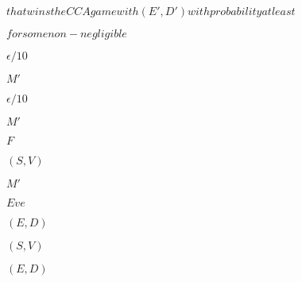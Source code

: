 \documentclass[10pt]{book}
\begin{document}
\begin{mdSnippets}
\begin{mdInlineSnippet}[8e20f2ad2f9a2e0359fc554aa92ce8ee]
$ that wins the CCA game with (E',D') with probability at least $\end{mdInlineSnippet}%
\begin{mdInlineSnippet}[70dfa4b4b54c7864c2bc42c5a41ca800]%
$for some non-negligible $\end{mdInlineSnippet}%
\begin{mdInlineSnippet}%
$\epsilon /10$\end{mdInlineSnippet}%
\begin{mdInlineSnippet}[c0c8156de7a5455113e67f33c15182fb]%
$M'$\end{mdInlineSnippet}%
\begin{mdInlineSnippet}%
$\epsilon /10$\end{mdInlineSnippet}%
\begin{mdInlineSnippet}[c0c8156de7a5455113e67f33c15182fb]%
$M'$\end{mdInlineSnippet}%
\begin{mdInlineSnippet}[800618943025315f869e4e1f09471012]%
$F$\end{mdInlineSnippet}%
\begin{mdInlineSnippet}[134d0e1645a1f38f9d7ef80d95389edd]%
$(S,V)$\end{mdInlineSnippet}%
\begin{mdInlineSnippet}[c0c8156de7a5455113e67f33c15182fb]%
$M'$\end{mdInlineSnippet}%
\begin{mdInlineSnippet}%
$Eve$\end{mdInlineSnippet}%
\begin{mdInlineSnippet}[c150726dc018e82825c0c3617f46a1c9]%
$(E,D)$\end{mdInlineSnippet}%
\begin{mdInlineSnippet}[134d0e1645a1f38f9d7ef80d95389edd]%
$(S,V)$\end{mdInlineSnippet}%
\begin{mdInlineSnippet}[c150726dc018e82825c0c3617f46a1c9]%
$(E,D)$\end{mdInlineSnippet}%
\begin{mdInlineSnippet}[c4ca4238a0b923820dcc509a6f75849b]%

\end{mdInlineSnippet}
\end{mdSnippets}
\end{document}
